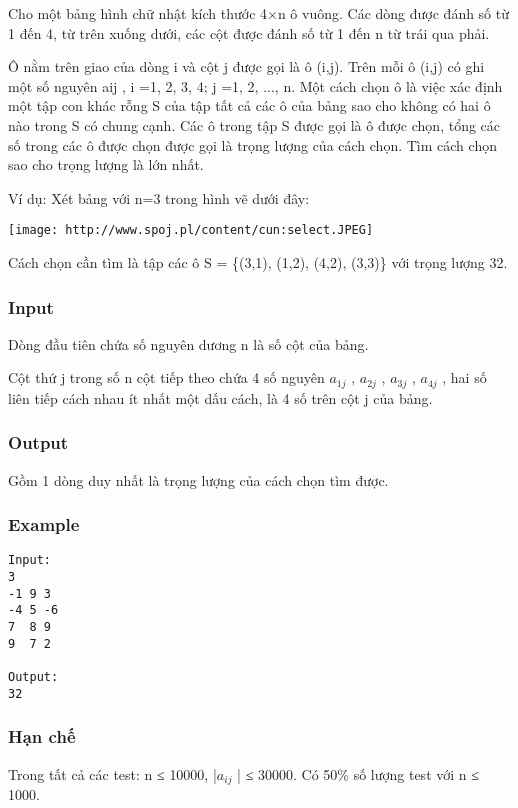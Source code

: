 

Cho một bảng hình chữ nhật kích thước 4×n ô vuông. Các dòng được đánh số từ 1 đến 4, từ trên xuống dưới, các cột được đánh số từ 1 đến n từ trái qua phải.

Ô nằm trên giao của dòng i và cột j được gọi là ô (i,j). Trên mỗi ô (i,j) có ghi một số nguyên aij , i =1, 2, 3, 4; j =1, 2, ..., n. Một cách chọn ô là việc xác định một tập con khác rỗng S của tập tất cả các ô của bảng sao cho không có hai ô nào trong S có chung cạnh. Các ô trong tập S được gọi là ô được chọn, tổng các số trong các ô được chọn được gọi là trọng lượng của cách chọn. Tìm cách chọn sao cho trọng lượng là lớn nhất.

Ví dụ: Xét bảng với n=3 trong hình vẽ dưới đây:


\texttt{[image: http://www.spoj.pl/content/cun:select.JPEG]}

Cách chọn cần tìm là tập các ô S = \{(3,1), (1,2), (4,2), (3,3)\} với trọng lượng 32.

\subsubsection{Input}

Dòng đầu tiên chứa số nguyên dương n là số cột của bảng.

Cột thứ j trong số n cột tiếp theo chứa 4 số nguyên $a_{1j}$ , $a_{2j}$ , $a_{3j}$ , $a_{4j}$ , hai số liên tiếp cách nhau ít nhất một dấu cách, là 4 số trên cột j của bảng.

\subsubsection{Output}

Gồm 1 dòng duy nhất là trọng lượng của cách chọn tìm được.

\subsubsection{Example}
\begin{verbatim}
Input:
3
-1 9 3
-4 5 -6
7  8 9
9  7 2

Output:
32

\end{verbatim}

\subsubsection{Hạn chế}

Trong tất cả các test: n ≤ 10000, |$a_{ij}$ | ≤ 30000. Có 50\% số lượng test với n ≤ 1000.
